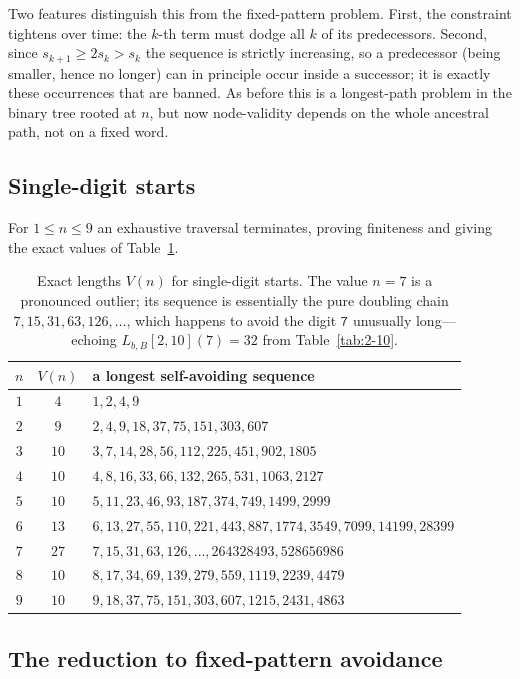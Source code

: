 \documentclass[11pt]{article}
\theoremstyle{plain}
\theoremstyle{definition}
\theoremstyle{remark}
\newcommand{\Lbb}{L_{b,B}}
\begin{document}
Two features distinguish this from the fixed-pattern problem. First, the constraint tightens over time: the $k$-th term must dodge all $k$ of its predecessors. Second, since $s_{k+1}\ge 2s_k>s_k$ the sequence is strictly increasing, so a predecessor (being smaller, hence no longer) can in principle occur inside a successor; it is exactly these occurrences that are banned. As before this is a longest-path problem in the binary tree rooted at $n$, but now node-validity depends on the whole ancestral path, not on a fixed word.

\subsection{Single-digit starts}

For $1\le n\le 9$ an exhaustive traversal terminates, proving finiteness and giving the exact values of Table~\ref{tab:variant}.

\begin{table}[h]
\centering
\begin{tabular}{ccl}
\toprule
$n$ & $V(n)$ & a longest self-avoiding sequence \\
\midrule
$1$ & $4$  & $1,2,4,9$ \\
$2$ & $9$  & $2,4,9,18,37,75,151,303,607$ \\
$3$ & $10$ & $3,7,14,28,56,112,225,451,902,1805$ \\
$4$ & $10$ & $4,8,16,33,66,132,265,531,1063,2127$ \\
$5$ & $10$ & $5,11,23,46,93,187,374,749,1499,2999$ \\
$6$ & $13$ & $6,13,27,55,110,221,443,887,1774,3549,7099,14199,28399$ \\
$7$ & $27$ & $7,15,31,63,126,\dots,264328493,528656986$ \\
$8$ & $10$ & $8,17,34,69,139,279,559,1119,2239,4479$ \\
$9$ & $10$ & $9,18,37,75,151,303,607,1215,2431,4863$ \\
\bottomrule
\end{tabular}
\caption{Exact lengths $V(n)$ for single-digit starts. The value $n=7$ is a pronounced outlier; its sequence is essentially the pure doubling chain $7,15,31,63,126,\dots$, which happens to avoid the digit $\texttt{7}$ unusually long---echoing $\Lbb[2,10](7)=32$ from Table~\ref{tab:2-10}.}
\label{tab:variant}
\end{table}

\subsection{The reduction to fixed-pattern avoidance}
\end{document}
